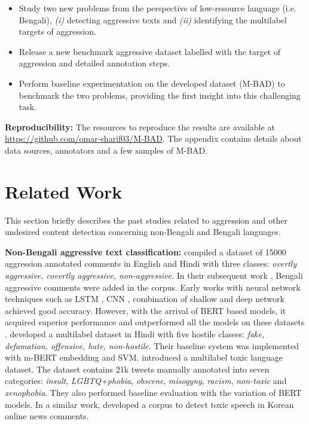 \documentclass[11pt]{article}
\begin{document}
\begin{itemize}
     \item Study two new problems from the perspective of low-resource language (i.e. Bengali), \textit{(i)} detecting aggressive texts and \textit{(ii)} identifying the multilabel targets of aggression. 
    \item Release a new benchmark aggressive dataset labelled with the target of aggression and detailed annotation steps. 
    \item Perform baseline experimentation on the developed dataset (M-BAD) to benchmark the two problems, providing the first insight into this challenging task.
\end{itemize}

\textbf{Reproducibility:} The resources to reproduce the results are available at \textcolor{blue}{\href{https://github.com/omar-sharif03/M-BAD}{https://github.com/omar-sharif03/M-BAD}}. The appendix contains details about data sources, annotators and a few samples of M-BAD.

\section{Related Work}
This section briefly describes the past studies related to aggression and other undesired content detection concerning non-Bengali and Bengali languages. 

\textbf{Non-Bengali aggressive text classification:}
\citet{kumar-etal-2018-benchmarking} compiled a dataset of 15000 aggression annotated comments in English and Hindi with three classes: \textit{overtly aggressive, covertly aggressive, non-aggressive}. In their subsequent work \citep{kumar-etal-2020-evaluating}, Bengali aggressive comments were added in the corpus. Early works with neural network techniques such as LSTM \citep{nikhil-etal-2018-lstms}, CNN \citep{kumari-singh-2020-ai}, combination of shallow and deep network \citep{golem-etal-2018-combining} achieved good accuracy. However, with the arrival of BERT based models, it acquired superior performance and outperformed all the models on these datasets \citep{risch-krestel-2020-bagging,gordeev-lykova-2020-bert,
sharif-etal-2021-nlp}. \citet{bhardwaj2020hostility} developed a multilabel dataset in Hindi with five hostile classes: \textit{fake, defamation, offensive, hate, non-hostile}. Their baseline system was implemented with m-BERT embedding and SVM. \citet{leite-etal-2020-toxic} introduced a multilabel toxic language dataset. The dataset contains 21k tweets manually annotated into seven categories: \textit{insult}, \textit{LGBTQ+phobia}, \textit{obscene}, \textit{misogyny}, \textit{racism}, \textit{non-toxic} and \textit{xenophobia}. They also performed baseline evaluation with the variation of BERT models. In a similar work, \citet{moon-etal-2020-beep} developed a corpus to detect toxic speech in Korean online news comments. 
\end{document}
